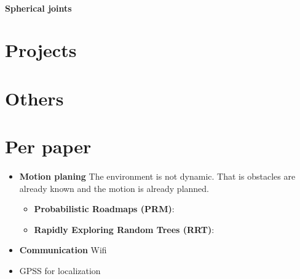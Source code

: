 \documentclass{article}
\begin{document}
		\paragraph{Spherical joints}
			\cite{tagliabue-2017-robust-collaborative-object-transportation-using-multiple-mavs}
	
	\section{Projects}
		\cite{ollero-2018-the-aeroarms-project-aerial-robots-with-advanced-manipulation-capabilities-for-inspection-and-maintenance}
	\section{Others}
	\section{Per paper}
		\paragraph{\cite{spurny-2019-cooperative-transport-of-large-objects-by-a-pair-of-unmanned-aerial-systems-using-sampling-based-motion-planning}}
			\begin{itemize}
				\item \textbf{Motion planing} The environment is not dynamic. That is obstacles are already known and the motion is already planned.
					\begin{itemize}
						\item \textbf{Probabilistic Roadmaps (PRM)}: \cite{lavalle-1998-rapidly-exploring-random-trees-a-new-tool-for-path-planning}
						\item \textbf{Rapidly Exploring Random Trees (RRT)}: \cite{kavraki-1996-probabilistic-roadmaps-for-path-planning-in-high-dimensional-configuration-spaces}
					\end{itemize}
				\item \textbf{Communication} Wifi
				\item GPSS for localization
			\end{itemize}
\end{document}
